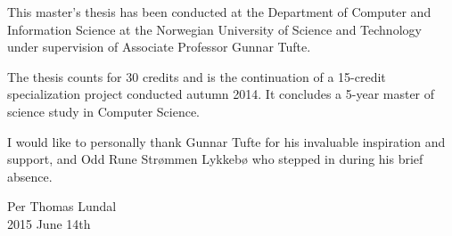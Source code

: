 This master's thesis has been conducted at the Department of Computer and Information Science at the Norwegian University of Science and Technology under supervision of Associate Professor Gunnar Tufte.

The thesis counts for 30 credits and is the continuation of a 15-credit specialization project conducted autumn 2014.
It concludes a 5-year master of science study in Computer Science.

I would like to personally thank Gunnar Tufte for his invaluable inspiration and support, and Odd Rune Strømmen Lykkebø who stepped in during his brief absence.

\vspace{\fill}

\begin{flushright}
Per Thomas Lundal
\\
2015 June 14th
\end{flushright}
